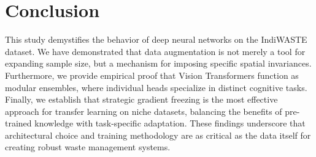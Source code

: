\documentclass[12pt,a4paper]{article}
\begin{document}
\vspace{2em}

\section{Conclusion}
This study demystifies the behavior of deep neural networks on the IndiWASTE dataset. We have demonstrated that data augmentation is not merely a tool for expanding sample size, but a mechanism for imposing specific spatial invariances. Furthermore, we provide empirical proof that Vision Transformers function as modular ensembles, where individual heads specialize in distinct cognitive tasks. Finally, we establish that strategic gradient freezing is the most effective approach for transfer learning on niche datasets, balancing the benefits of pre-trained knowledge with task-specific adaptation. These findings underscore that architectural choice and training methodology are as critical as the data itself for creating robust waste management systems. 
\end{document}
